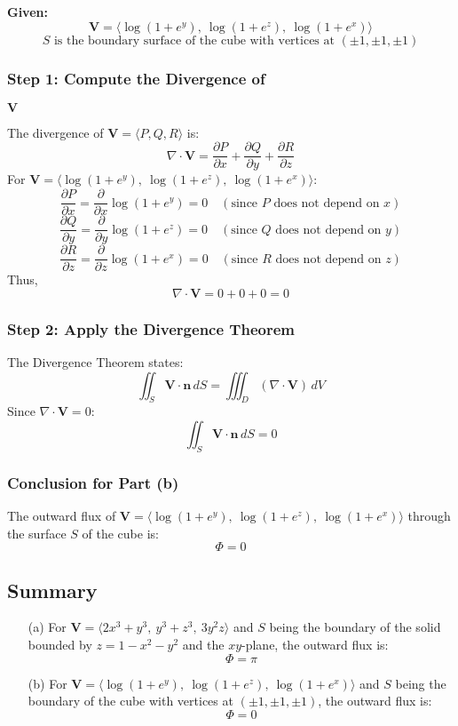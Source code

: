 \documentclass[11pt]{article}
\begin{document}
\textbf{Given:}
\[
\mathbf{V} = \langle \log(1 + e^y), \ \log(1 + e^z), \ \log(1 + e^x) \rangle
\]
\[
S \text{ is the boundary surface of the cube with vertices at } (\pm 1, \pm 1, \pm 1)
\]

\subsubsection*{Step 1: Compute the Divergence of } $\mathbf{V}$

The divergence of \( \mathbf{V} = \langle P, Q, R \rangle \) is:
\[
\nabla \cdot \mathbf{V} = \frac{\partial P}{\partial x} + \frac{\partial Q}{\partial y} + \frac{\partial R}{\partial z}
\]
For \( \mathbf{V} = \langle \log(1 + e^y), \ \log(1 + e^z), \ \log(1 + e^x) \rangle \):
\[
\frac{\partial P}{\partial x} = \frac{\partial}{\partial x} \log(1 + e^y) = 0 \quad (\text{since } P \text{ does not depend on } x)
\]
\[
\frac{\partial Q}{\partial y} = \frac{\partial}{\partial y} \log(1 + e^z) = 0 \quad (\text{since } Q \text{ does not depend on } y)
\]
\[
\frac{\partial R}{\partial z} = \frac{\partial}{\partial z} \log(1 + e^x) = 0 \quad (\text{since } R \text{ does not depend on } z)
\]
Thus,
\[
\nabla \cdot \mathbf{V} = 0 + 0 + 0 = 0
\]

\subsubsection*{Step 2: Apply the Divergence Theorem}

The Divergence Theorem states:
\[
\iint_{S} \mathbf{V} \cdot \mathbf{n} \, dS = \iiint_{D} (\nabla \cdot \mathbf{V}) \, dV
\]
Since \( \nabla \cdot \mathbf{V} = 0 \):
\[
\iint_{S} \mathbf{V} \cdot \mathbf{n} \, dS = 0
\]

\subsubsection*{Conclusion for Part (b)}

The outward flux of \( \mathbf{V} = \langle \log(1 + e^y), \ \log(1 + e^z), \ \log(1 + e^x) \rangle \) through the surface \( S \) of the cube is:
\[
\boxed{ \Phi = 0 }
\]

\newpage

\subsection{Summary}

\begin{enumerate}
    \item[(a)] For \( \mathbf{V} = \langle 2x^3 + y^3, \ y^3 + z^3, \ 3y^2 z \rangle \) and \( S \) being the boundary of the solid bounded by \( z = 1 - x^2 - y^2 \) and the \( xy \)-plane, the outward flux is:
    \[
    \Phi = \pi
    \]

    \item[(b)] For \( \mathbf{V} = \langle \log(1 + e^y), \ \log(1 + e^z), \ \log(1 + e^x) \rangle \) and \( S \) being the boundary of the cube with vertices at \( (\pm 1, \pm 1, \pm 1) \), the outward flux is:
    \[
    \Phi = 0
    \]
\end{enumerate}
\end{document}

